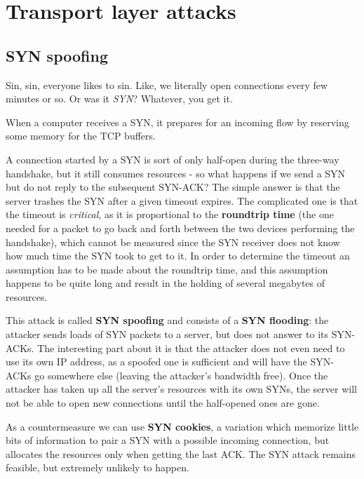 \vspace{0.5em} 


\section{Transport layer attacks}


\subsection{SYN spoofing}
Sin, sin, everyone likes to sin. Like, we literally open connections every few minutes or so. Or was it \textit{SYN}? Whatever, you get it.

When a computer receives a SYN, it prepares for an incoming flow by reserving some memory for the TCP buffers.

A connection started by a SYN is sort of only half-open during the three-way handshake, but it still consumes resources - so what happens if we send a SYN but do not reply to the subsequent SYN-ACK? The simple answer is that the server trashes the SYN after a given timeout expires. The complicated one is that the timeout is \textit{critical}, as it is proportional to the \textbf{roundtrip time} (the one needed for a packet to go back and forth between the two devices performing the handshake), which cannot be measured since the SYN receiver does not know how much time the SYN took to get to it. In order to determine the timeout an assumption has to be made about the roundtrip time, and this assumption happens to be quite long and result in the holding of several megabytes of resources.
 
This attack is called \textbf{SYN spoofing} and consists of a \textbf{SYN flooding}: the attacker sends loads of SYN packets to a server, but does not answer to its SYN-ACKs. The interesting part about it is that the attacker does not even need to use its own IP address, as a spoofed one is sufficient and will have the SYN-ACKs go somewhere else (leaving the attacker’s bandwidth free). Once the attacker has taken up all the server’s resources with its own SYNs, the server will not be able to open new connections until the half-opened ones are gone.

As a countermeasure we can use \textbf{SYN cookies}, a variation which memorize little bits of information to pair a SYN with a possible incoming connection, but allocates the resources only when getting the last ACK. The SYN attack remains feasible, but extremely unlikely to happen.

